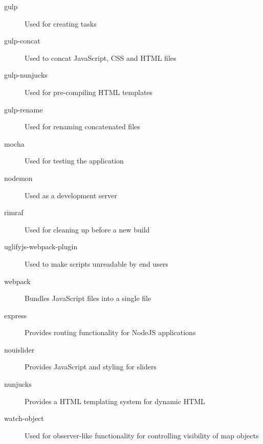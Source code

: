 \begin{description}
    \item[gulp] Used for creating tasks
    \item[gulp-concat] Used to concat JavaScript, CSS and HTML files
    \item[gulp-nunjucks] Used for pre-compiling HTML templates
    \item[gulp-rename]  Used for renaming concatenated files
    \item[mocha] Used for testing the application
    \item[nodemon] Used as a development server
    \item[rimraf] Used for cleaning up before a new build
    \item[uglifyjs-webpack-plugin] Used to make scripts unreadable by end users
    \item[webpack] Bundles JavaScript files into a single file
    \item[express] Provides routing functionality for NodeJS applications
    \item[nouislider] Provides JavaScript and styling for sliders
    \item[nunjucks] Provides a HTML templating system for dynamic HTML
    \item[watch-object] Used for observer-like functionality for controlling visibility of map objects
\end{description}